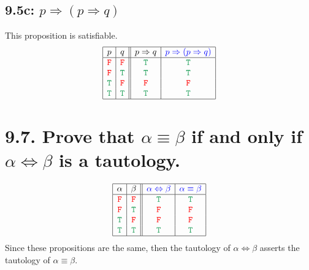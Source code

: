\documentclass{article}
\begin{document}
\subsection*{9.5c: $p\Rightarrow(p\Rightarrow q)$}
This proposition is satisfiable.
\[\begin{array}{|c|c||c|c|}
\hline
p&q&p\Rightarrow q&\textcolor{blue}{p\Rightarrow(p\Rightarrow q)}\\
\hline
\textcolor{red}{\tt{F}}&\textcolor{red}{\tt{F}}&\textcolor{ForestGreen}{\tt{T}}&\textcolor{ForestGreen}{\tt{T}}\\
\textcolor{red}{\tt{F}}&\textcolor{ForestGreen}{\tt{T}}&\textcolor{ForestGreen}{\tt{T}}&\textcolor{ForestGreen}{\tt{T}}\\
\textcolor{ForestGreen}{\tt{T}}&\textcolor{red}{\tt{F}}&\textcolor{red}{\tt{F}}&\textcolor{red}{\tt{F}}\\
\textcolor{ForestGreen}{\tt{T}}&\textcolor{ForestGreen}{\tt{T}}&\textcolor{ForestGreen}{\tt{T}}&\textcolor{ForestGreen}{\tt{T}}\\
\hline
\end{array}\]
\section*{9.7. Prove that $\alpha\equiv\beta$ if and only if $\alpha\Leftrightarrow\beta$ is a tautology.}
\[\begin{array}{|c|c||c|c|}
\hline
\alpha&\beta&\textcolor{blue}{\alpha\Leftrightarrow\beta}&\textcolor{blue}{\alpha\equiv\beta}\\
\hline
\textcolor{red}{\tt{F}}&\textcolor{red}{\tt{F}}&\textcolor{ForestGreen}{\tt{T}}&\textcolor{ForestGreen}{\tt{T}}\\
\textcolor{red}{\tt{F}}&\textcolor{ForestGreen}{\tt{T}}&\textcolor{red}{\tt{F}}&\textcolor{red}{\tt{F}}\\
\textcolor{ForestGreen}{\tt{T}}&\textcolor{red}{\tt{F}}&\textcolor{red}{\tt{F}}&\textcolor{red}{\tt{F}}\\
\textcolor{ForestGreen}{\tt{T}}&\textcolor{ForestGreen}{\tt{T}}&\textcolor{ForestGreen}{\tt{T}}&\textcolor{ForestGreen}{\tt{T}}\\
\hline
\end{array}\]
Since these propositions are the same, then the tautology of $\alpha\Leftrightarrow\beta$ asserts the tautology of $\alpha\equiv\beta$.
\end{document}
